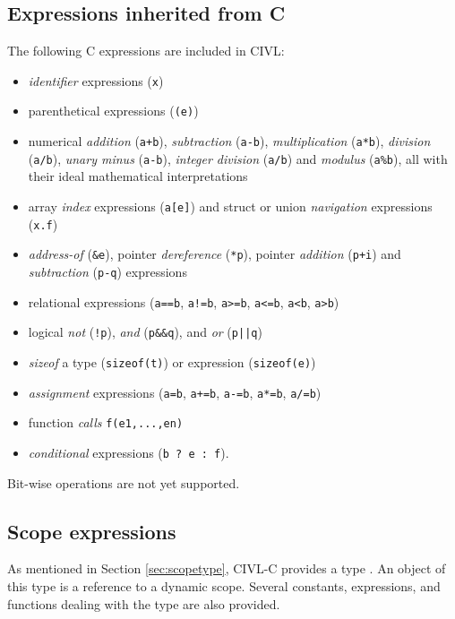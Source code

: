 \subsection{Expressions inherited from C}

The following C expressions are included in CIVL: 
\begin{itemize}
\item \emph{identifier} expressions (\texttt{x})
\item parenthetical expressions (\verb!(e)!)
\item numerical \emph{addition} (\verb!a+b!), \emph{subtraction} (\verb!a-b!),
  \emph{multiplication} (\verb!a*b!), \emph{division} (\verb!a/b!),
  \emph{unary minus} (\verb!a-b!),
  \emph{integer division} (\verb!a/b!) and \emph{modulus} (\verb!a%b!),
  all with their ideal mathematical interpretations
\item array \emph{index} expressions (\verb!a[e]!) and struct or union
  \emph{navigation} expressions (\verb!x.f!)
\item \emph{address-of} (\verb!&e!), pointer \emph{dereference} (\verb!*p!),
  pointer \emph{addition} (\verb!p+i!) and \emph{subtraction} (\verb!p-q!)
  expressions
\item relational expressions (\verb!a==b!, \verb~a!=b~, \verb!a>=b!,
  \verb!a<=b!, \verb!a<b!, \verb!a>b!)
\item logical \emph{not} (\verb~!p~), \emph{and} (\verb!p&&q!), and
  \emph{or} (\verb!p||q!)
\item \emph{sizeof} a type (\verb!sizeof(t)!) or expression (\verb!sizeof(e)!)
\item \emph{assignment} expressions (\verb!a=b!, \verb!a+=b!, \verb!a-=b!,
  \verb!a*=b!, \verb!a/=b!)
\item function \emph{calls} \verb!f(e1,...,en)!
\item \emph{conditional} expressions (\verb!b ? e : f!).
\end{itemize}

Bit-wise operations are not yet supported.

\subsection{Scope expressions}
\label{sec:scopeexpr}

As mentioned in Section \ref{sec:scopetype}, CIVL-C provides a type
\cscope.  An object of this type is a reference to a dynamic scope.
Several constants, expressions, and functions dealing with the
\cscope{} type are also provided.


